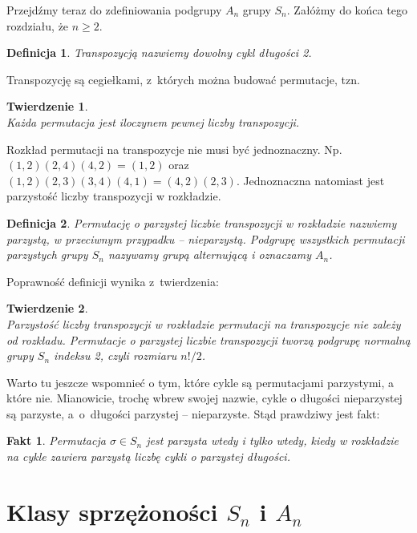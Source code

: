 \documentclass[licencjacka]{pracamgr}
\newtheorem{deff}{Definicja}[section]
\newtheorem{thh}{Twierdzenie}[section]
\newtheorem{fact}{Fakt}[section]
\begin{document}
\pagebreak[2]

Przejdźmy teraz do zdefiniowania podgrupy $A_n$ grupy $S_n$.
Załóżmy do końca tego rozdziału, że $n \ge 2$.

\begin{deff}
	\emph{Transpozycją} nazwiemy dowolny cykl długości 2.
\end{deff}

Transpozycję są cegiełkami, z~których można budować permutacje, tzn.

\begin{thh} $ $ \\
	Każda permutacja jest iloczynem pewnej liczby transpozycji.
\end{thh}

Rozkład permutacji na transpozycje nie musi być jednoznaczny.
Np. $(1, 2) (2, 4) (4, 2) = (1, 2)$ oraz $(1, 2) (2, 3) (3, 4) (4, 1) = (4, 2) (2, 3)$.
Jednoznaczna natomiast jest parzystość liczby transpozycji w rozkładzie.

\begin{deff}
	Permutację o parzystej liczbie transpozycji w rozkładzie nazwiemy \emph{parzystą}, 
	w przeciwnym przypadku -- \emph{nieparzystą}.
	Podgrupę wszystkich permutacji parzystych grupy $S_n$ nazywamy \emph{grupą alternującą} i oznaczamy $A_n$.
\end{deff}


Poprawność definicji wynika z~twierdzenia:

\begin{thh}\label{thm_A_n} $ $ \\
	Parzystość liczby transpozycji w rozkładzie permutacji na transpozycje nie zależy od rozkładu.
	Permutacje o parzystej liczbie transpozycji tworzą podgrupę normalną grupy $S_n$ indeksu 2, czyli rozmiaru $n!/2$.
\end{thh}

Warto tu jeszcze wspomnieć o tym, które cykle są permutacjami parzystymi, a które nie.
Mianowicie, trochę wbrew swojej nazwie, cykle o długości nieparzystej są parzyste, 
a~o~długości parzystej -- nieparzyste.
Stąd prawdziwy jest fakt:

\begin{fact}\label{fact_typ_A_n}
	Permutacja $\sigma \in S_n$ jest parzysta wtedy i tylko wtedy, kiedy w rozkładzie na cykle 
	zawiera parzystą liczbę cykli o parzystej długości.
\end{fact}


\section{Klasy sprzężoności $S_n$ i $A_n$}
\end{document}
